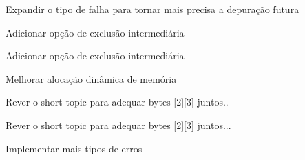
\begin{DoxyRefList}
\item[\label{todo__todo000006}%
\hypertarget{todo__todo000006}{}%
Global \hyperlink{mqtt__sn_8h_a172afa34fe10ad1ee4ffc0d226b35b4d}{mqtt\+\_\+sn\+\_\+check\+\_\+rc} (uint8\+\_\+t rc)]Expandir o tipo de falha para tornar mais precisa a depuração futura  
\item[\label{todo__todo000005}%
\hypertarget{todo__todo000005}{}%
Global \hyperlink{mqtt__sn_8h_ad0a729c99366dad086be6be954e71f2c}{mqtt\+\_\+sn\+\_\+delete\+\_\+queue} ()]Adicionar opção de exclusão intermediária  
\item[\label{todo__todo000005}%
\hypertarget{todo__todo000005}{}%
Global \hyperlink{mqtt__sn_8h_ad0a729c99366dad086be6be954e71f2c}{mqtt\+\_\+sn\+\_\+delete\+\_\+queue} ()]Adicionar opção de exclusão intermediária  
\item[\label{todo__todo000004}%
\hypertarget{todo__todo000004}{}%
Global \hyperlink{mqtt__sn_8h_a575514d0f0fd3b6c5c4a2c75e604bf79}{mqtt\+\_\+sn\+\_\+insert\+\_\+queue} (\hyperlink{structmqtt__sn__task__t}{mqtt\+\_\+sn\+\_\+task\+\_\+t} new)]Melhorar alocação dinâmica de memória  
\item[\label{todo__todo000001}%
\hypertarget{todo__todo000001}{}%
Global \hyperlink{mqtt__sn_8h_af9146fa082fe2bc6612fb13dbb20ed36}{mqtt\+\_\+sn\+\_\+recv\+\_\+parser} (const uint8\+\_\+t $\ast$data)]Rever o short topic para adequar bytes \mbox{[}2\mbox{]}\mbox{[}3\mbox{]} juntos.. 

Rever o short topic para adequar bytes \mbox{[}2\mbox{]}\mbox{[}3\mbox{]} juntos...  
\item[\label{todo__todo000003}%
\hypertarget{todo__todo000003}{}%
Global \hyperlink{mqtt__sn_8h_a754c1055b4431040415cf01b39caaa98ae7b7a388c90c2c5428cced225760885f}{S\+U\+C\+C\+E\+S\+S\+\_\+\+C\+O\+N} ]Implementar mais tipos de erros 
\end{DoxyRefList}